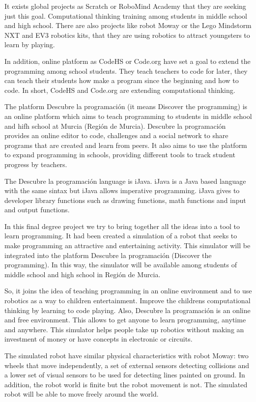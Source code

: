 It exists global projects as Scratch or RoboMind Academy that they are seeking just this goal. Computational thinking training among students in middle school and high school. There are also projects like robot Moway or the Lego Mindstorm NXT and EV3 robotics kits, that they are using robotics to attract youngsters to learn by playing. 

In addition, online platform as CodeHS or Code.org have set a goal to extend the programming among school students. They teach teachers to code for later, they can teach their students how make a program since the beginning and how to code. In short, CodeHS and Code.org are extending computational thinking.

The platform Descubre la programación (it means Discover the programming) is an online platform which aims to teach programming to students in middle school and hifh school at Murcia (Región de Murcia). Descubre la programación provides an online editor to code, challenges and a social network to share programs that are created and learn from peers. It also aims to use the platform to expand programming in schools, providing different tools to track student progress by teachers.

The Descubre la programación language is iJava. iJava is a Java based language with the same sintax but iJava allows imperative programming. iJava gives to developer library functions such as drawing functions, math functions and input and output functions.

In this final degree project we try to bring together all the ideas into a tool to learn programming. It had been created a simulation of a robot that seeks to make programming an attractive and entertaining activity. This simulator will be integrated into the platform Descubre la programación (Discover the programming). In this way, the simulator will be available among students of middle school and high school in Región de Murcia.

So, it joins the idea of teaching programming in an online environment and to use robotics as a way to children entertainment. Improve the childrens computational thinking by learning to code playing. Also, Descubre la programación is an online and free environment. This allows to get anyone to learn programming, anytime and anywhere. This simulator helps people take up robotics without making an investment of money or have concepts in electronic or  circuits.


The simulated robot have similar physical characteristics with robot Moway: two wheels that move independently, a set of external sensors detecting collisions and a lower set of visual sensors to be used for detecting lines painted on ground. In addition, the robot world is finite but the robot movement is not. The simulated robot will be able to move freely around the world.

